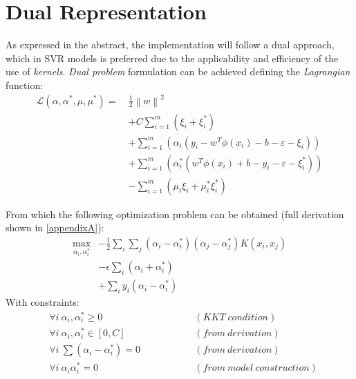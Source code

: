 \documentclass[12pt]{article}
\newcommand{\norm}[1]{\left\lVert#1\right\rVert}
\newcommand{\Lagr}{\mathcal{L}}
\begin{document}
	\section{Dual Representation}
	As expressed in the abstract, the implementation will follow a dual approach, which in SVR models is preferred due to the applicability and efficiency of the use of \textit{kernels}. \textit{Dual problem} formulation can be achieved defining the \textit{Lagrangian} function:
	\begin{equation}\label{eq:4}
	\begin{aligned}
		\Lagr(\alpha,\alpha^*,\mu,\mu^*) =  \ &\frac{1}{2}\norm{w}^2\\
		&+C\sum_{i=1}^{m}(\xi_{i} + \xi_{i}^*) \\
		&+ \sum_{i=1}^{m}(\alpha_i(y_i - w^T\phi(x_i) - b - \varepsilon - \xi_i))\\
		&+ \sum_{i=1}^{m}(\alpha_i^*(w^T\phi(x_i) + b - y_i - \varepsilon - \xi_i^*)) \\
		&- \sum_{i=1}^{m}(\mu_i\xi_i + \mu_i^*\xi_i^*)
	\end{aligned}
	\end{equation}
	
	From which the following optimization problem can be obtained (full derivation shown in \ref{appendixA}):
	\begin{equation}\label{eq:5}
	\begin{aligned}
		\max_{\alpha_i,\alpha_i^*} &- \frac{1}{2}\sum_i\sum_j(\alpha_i - \alpha_i^*)(\alpha_j - \alpha_j^*)K(x_i,x_j) \\
		&- \epsilon\sum_i(\alpha_i + \alpha_i^*)\\
		&+ \sum_i y_i(\alpha_i - \alpha_i^*)
	\end{aligned}
	\end{equation}
	With constraints:
	\begin{subequations}
		\begin{align}
		&\forall i \: \alpha_i,\alpha_i^* \geq 0 \qquad\qquad &&(KKT\;condition) \label{eq:6a}\\
		&\forall i \: \alpha_i,\alpha_i^* \in [0,C]  \qquad\qquad &&(from \: derivation)\label{eq:6b}\\
		&\forall i \: \sum (\alpha_i - \alpha_i^*) = 0 \qquad\qquad &&(from \: derivation)\label{eq:6c}\\
		&\forall i \: \alpha_i \alpha_i^* = 0 \qquad\qquad &&(from \: model \: construction)\label{eq:6d}
		\end{align}
	\end{subequations}
	\pagebreak
\end{document}
